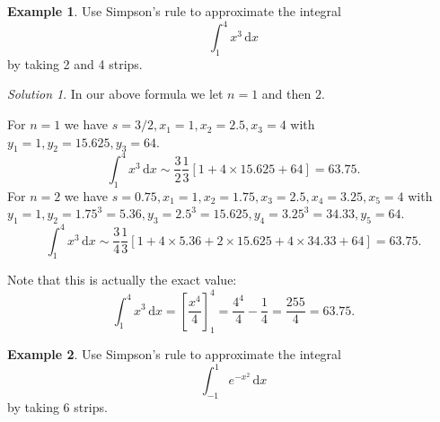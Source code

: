\documentclass[
  english,
  11pt,
  oneside]{book}
\newcommand{\slide}{}
\theoremstyle{definition}
\theoremstyle{definition}
\newtheorem{example}{Example}[chapter]
\theoremstyle{definition}
\theoremstyle{definition}
\theoremstyle{remark}
\newtheorem*{solution}{Solution}
\begin{document}
\slide

\begin{example}
Use Simpson's rule to approximate the integral
\[\int_1^4x^3\,\mathrm{d}x\]
by taking 2 and 4 strips.
\end{example}

\begin{solution}
In our above formula we let \(n=1\) and then \(2\).

For \(n=1\) we have \(s=3/2, x_1=1, x_2=2.5, x_3=4\) with \(y_1=1, y_2=15.625, y_3=64\).
\[\int_1^4x^3\,\mathrm{d}x\sim\frac32\frac13\left[1+4\times15.625+64\right] = 63.75.\]
For \(n=2\) we have \(s=0.75, x_1=1, x_2=1.75, x_3=2.5, x_4=3.25, x_5=4\) with \(y_1=1, y_2=1.75^3=5.36, y_3 = 2.5^3=15.625, y_4=3.25^3=34.33, y_5=64\).
\[\int_1^4x^3\,\mathrm{d}x\sim\frac34\frac13\left[1+4\times5.36+2\times15.625+4\times34.33+64\right] = 63.75.\]

Note that this is actually the exact value:
\[\int_1^4x^3\,\mathrm{d}x = \left[\frac{x^4}4\right]_1^4 = \frac{4^4}4-\frac14 = \frac{255}4=63.75.\]
\end{solution}

\slide

\begin{slidesonly}

\hbox{}
\slide
\hbox{}
\slide

\end{slidesonly}

\begin{example}
Use Simpson's rule to approximate the integral
\[\int_{-1}^1e^{-x^2}\,\mathrm{d}x\]
by taking 6 strips.
\end{example}
\end{document}

